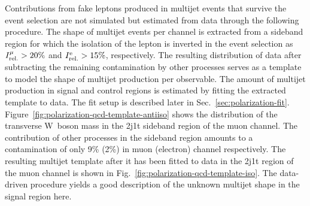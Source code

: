 
Contributions from fake leptons produced in multijet events that survive the event selection are not simulated but estimated from data through the following procedure. The shape of multijet events per channel is extracted from a sideband region for which the isolation of the lepton is inverted in the event selection as $I_\mathrm{rel.}^{\mu}>20\%$ and $I_\mathrm{rel.}^\mathrm{e}>15\%$, respectively. The resulting distribution of data after subtracting the remaining contamination by other processes serves as a template to model the shape of multijet production per observable. The amount of multijet production in signal and control regions is estimated by fitting the extracted template to data. The fit setup is described later in Sec.~\ref{sec:polarization-fit}. Figure~\ref{fig:polarization-qcd-template-antiiso} shows the distribution of the transverse W~boson mass in the 2j1t sideband region of the muon channel. The contribution of other processes in the sideband region amounts to a contamination of only 9\% (2\%) in muon (electron) channel respectively. The resulting multijet template after it has been fitted to data in the 2j1t region of the muon channel is shown in Fig.~\ref{fig:polarization-qcd-template-iso}. The data-driven procedure yields a good description of the unknown multijet shape in the signal region here.

